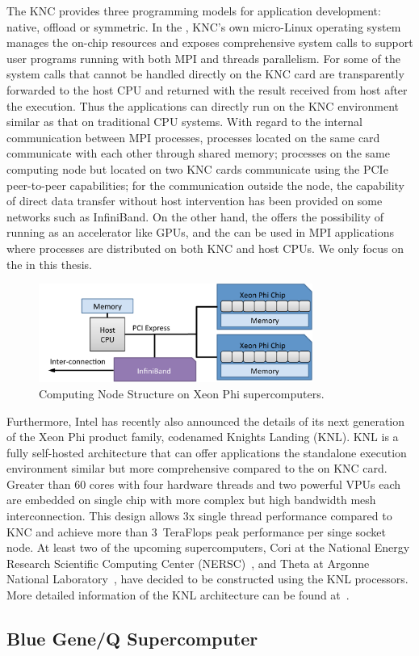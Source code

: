 The KNC provides three programming models for application
development: native, offload or symmetric. In the , KNC's
own micro-Linux operating system manages the on-chip resources and exposes
comprehensive system calls to support user programs running with both MPI
and threads parallelism. For some of the system calls that cannot be handled
directly on the KNC card are transparently forwarded to the host CPU and
returned with the result received from host after the execution.
Thus the applications can directly run on the KNC environment similar as
that on traditional CPU systems. With regard to the internal communication
between MPI processes,  processes located on the same card communicate
with each other through shared memory; processes on the same computing node
but located on two KNC cards communicate using the PCIe peer-to-peer
capabilities; for the communication outside the node, the capability of
direct data transfer without host intervention has been provided on some
networks such as InfiniBand. On the other hand, the 
offers the possibility of running as an accelerator like GPUs, and
the  can be used in MPI applications where processes
are distributed on both KNC and host CPUs. We only focus on the  in this thesis.

\begin{figure}[ht]
\centering
\includegraphics[width=0.8\textwidth]{figures/background/arch-mic-node.pdf}
\caption{Computing Node Structure on Xeon Phi supercomputers.}
\label{fig:arch-mic-node}
\end{figure}

Furthermore, Intel has recently also announced the details of its next
generation of the Xeon Phi product family, codenamed Knights Landing (KNL).
KNL is a fully self-hosted architecture that can offer applications the
standalone execution environment similar but more comprehensive compared
to the  on KNC card. Greater than 60
cores with four hardware threads and two powerful VPUs each are embedded
on single chip with more complex but high bandwidth mesh interconnection.
This design allows 3x single thread performance compared to KNC and achieve
more than 3~TeraFlops peak performance per singe socket node. At least
two of the upcoming supercomputers, Cori at the National Energy Research
Scientific Computing Center (NERSC)~\cite{cori}, and Theta at Argonne National
Laboratory~\cite{theta}, have decided to be constructed using the KNL
processors. More detailed information of the KNL architecture can be found
at~\cite{knl}.

\subsection{Blue Gene/Q Supercomputer}

